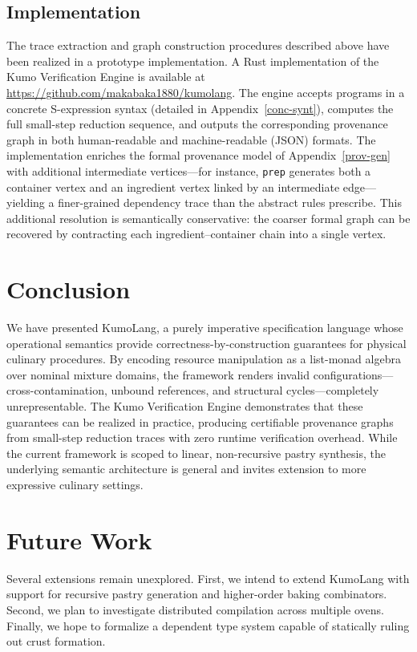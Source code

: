 \documentclass[11pt, a4paper]{article}
\begin{document}
\subsection{Implementation}
The trace extraction and graph construction procedures described above have been realized in a prototype implementation. A Rust implementation of the Kumo Verification Engine is available at \url{https://github.com/makabaka1880/kumolang}. The engine accepts programs in a concrete S-expression syntax (detailed in Appendix~\ref{conc-synt}), computes the full small-step reduction sequence, and outputs the corresponding provenance graph in both human-readable and machine-readable (JSON) formats. The implementation enriches the formal provenance model of Appendix~\ref{prov-gen} with additional intermediate vertices—for instance, \texttt{prep} generates both a container vertex and an ingredient vertex linked by an intermediate edge—yielding a finer-grained dependency trace than the abstract rules prescribe. This additional resolution is semantically conservative: the coarser formal graph can be recovered by contracting each ingredient--container chain into a single vertex.

\section{Conclusion}

We have presented KumoLang, a purely imperative specification language whose operational semantics provide correctness-by-construction guarantees for physical culinary procedures. By encoding resource manipulation as a list-monad algebra over nominal mixture domains, the framework renders invalid configurations—cross-contamination, unbound references, and structural cycles—completely unrepresentable. The Kumo Verification Engine demonstrates that these guarantees can be realized in practice, producing certifiable provenance graphs from small-step reduction traces with zero runtime verification overhead. While the current framework is scoped to linear, non-recursive pastry synthesis, the underlying semantic architecture is general and invites extension to more expressive culinary settings.

\section{Future Work}

Several extensions remain unexplored. First, we intend to extend KumoLang with support for recursive pastry generation and higher-order baking combinators. Second, we plan to investigate distributed compilation across multiple ovens. Finally, we hope to formalize a dependent type system capable of statically ruling out crust formation.
\end{document}
